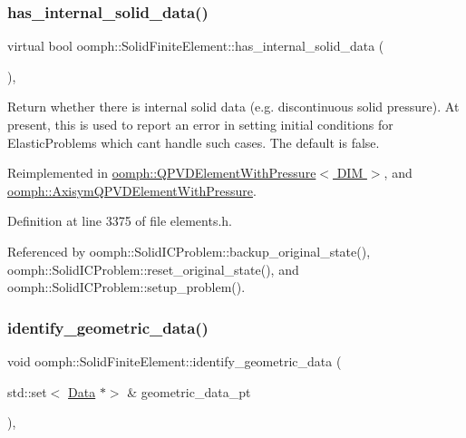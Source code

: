 \subsubsection{\texorpdfstring{has\+\_\+internal\+\_\+solid\+\_\+data()}{has\_internal\_solid\_data()}}
{\footnotesize\ttfamily virtual bool oomph\+::\+Solid\+Finite\+Element\+::has\+\_\+internal\+\_\+solid\+\_\+data (\begin{DoxyParamCaption}{ }\end{DoxyParamCaption})\hspace{0.3cm}{\ttfamily [inline]}, {\ttfamily [virtual]}}



Return whether there is internal solid data (e.\+g. discontinuous solid pressure). At present, this is used to report an error in setting initial conditions for Elastic\+Problems which can\textquotesingle{}t handle such cases. The default is false. 



Reimplemented in \hyperlink{classoomph_1_1QPVDElementWithPressure_ad94b8af9930b59635389d803b94046ad}{oomph\+::\+Q\+P\+V\+D\+Element\+With\+Pressure$<$ D\+I\+M $>$}, and \hyperlink{classoomph_1_1AxisymQPVDElementWithPressure_af5a06f24c310d233555f165189ff353a}{oomph\+::\+Axisym\+Q\+P\+V\+D\+Element\+With\+Pressure}.



Definition at line 3375 of file elements.\+h.



Referenced by oomph\+::\+Solid\+I\+C\+Problem\+::backup\+\_\+original\+\_\+state(), oomph\+::\+Solid\+I\+C\+Problem\+::reset\+\_\+original\+\_\+state(), and oomph\+::\+Solid\+I\+C\+Problem\+::setup\+\_\+problem().

\mbox{\label{classoomph_1_1SolidFiniteElement_a389e4773864d19ac82337ffc24e4dfa6}} 
\subsubsection{\texorpdfstring{identify\+\_\+geometric\+\_\+data()}{identify\_geometric\_data()}}
{\footnotesize\ttfamily void oomph\+::\+Solid\+Finite\+Element\+::identify\+\_\+geometric\+\_\+data (\begin{DoxyParamCaption}\item[{std\+::set$<$ \hyperlink{classoomph_1_1Data}{Data} $\ast$$>$ \&}]{geometric\+\_\+data\+\_\+pt }\end{DoxyParamCaption})\hspace{0.3cm}{\ttfamily [inline]}, {\ttfamily [virtual]}}



